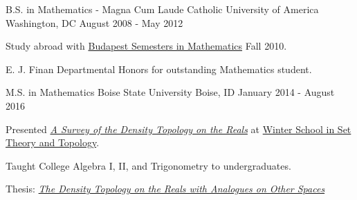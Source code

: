 

\begin{cventries}

  \cventry
    {B.S. in Mathematics - Magna Cum Laude} %
    {Catholic University of America} %
    {Washington, DC} %
    {August 2008 - May 2012} %
    {
      \begin{cvitems} %
        \item {Study abroad with \href{https://www.budapestsemesters.com/}{Budapest Semesters in Mathematics} Fall 2010.}
        \item {E. J. Finan Departmental Honors for outstanding Mathematics student.}
      \end{cvitems}
    }
  \cventry
    {M.S. in Mathematics} %
    {Boise State University} %
    {Boise, ID} %
    {January 2014 - August 2016} %
    {
      \begin{cvitems} %
        \item {Presented {\sl \href{https://www.winterschool.eu/files/755-A_Survey_of_the_Density_Topology_on_the_Reals1052963613.pdf}{A Survey of the Density Topology on the Reals}} at \href{https://www.winterschool.eu/2015/program}{Winter School in Set Theory and Topology}.}
        \item {Taught College Algebra I, II, and Trigonometry to undergraduates.}
        \item {Thesis: {\sl \href{https://scholarworks.boisestate.edu/td/1143/}{The Density Topology on the Reals with Analogues on Other Spaces}}}
      \end{cvitems}
    }

\end{cventries}
